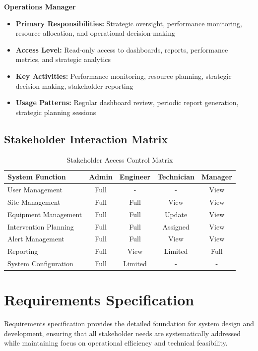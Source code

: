 \textbf{Operations Manager}
\begin{itemize}
\item \textbf{Primary Responsibilities:} Strategic oversight, performance monitoring, resource allocation, and operational decision-making
\item \textbf{Access Level:} Read-only access to dashboards, reports, performance metrics, and strategic analytics
\item \textbf{Key Activities:} Performance monitoring, resource planning, strategic decision-making, stakeholder reporting
\item \textbf{Usage Patterns:} Regular dashboard review, periodic report generation, strategic planning sessions
\end{itemize}

\subsection{Stakeholder Interaction Matrix}

\begin{table}[H]
\centering
\begin{tabular}{|l|c|c|c|c|}
\hline
\textbf{System Function} & \textbf{Admin} & \textbf{Engineer} & \textbf{Technician} & \textbf{Manager} \\
\hline
User Management & Full & - & - & View \\
\hline
Site Management & Full & Full & View & View \\
\hline
Equipment Management & Full & Full & Update & View \\
\hline
Intervention Planning & Full & Full & Assigned & View \\
\hline
Alert Management & Full & Full & View & View \\
\hline
Reporting & Full & View & Limited & Full \\
\hline
System Configuration & Full & Limited & - & - \\
\hline
\end{tabular}
\caption{Stakeholder Access Control Matrix}
\label{tab:stakeholder_access}
\end{table}

\section{Requirements Specification}

Requirements specification provides the detailed foundation for system design and development, ensuring that all stakeholder needs are systematically addressed while maintaining focus on operational efficiency and technical feasibility.


